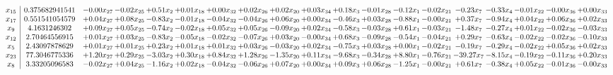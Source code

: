 \documentclass[9pt]{article}
\begin{document}
 \[\begin{array}{c| c c@{\hskip 2pt} c@{\hskip 2pt} c@{\hskip 2pt} c@{\hskip 2pt} c@{\hskip 2pt} c@{\hskip 2pt} c@{\hskip 2pt} c@{\hskip 2pt} c@{\hskip 2pt} c@{\hskip 2pt} c@{\hskip 2pt} c@{\hskip 2pt} c@{\hskip 2pt} c@{\hskip 2pt} c@{\hskip 2pt} c@{\hskip 2pt} c@{\hskip 2pt} }
 x_{15}   &  0.375682941541 & -0.00 x_{27} & -0.02 x_{25} & +  0.51 x_{2} & +  0.01 x_{18} & +  0.00 x_{32} & +  0.02 x_{26} & +  0.02 x_{20} & +  0.03 x_{34} & +  0.18 x_{3} & -0.01 x_{28} & -0.12 x_{1} & -0.02 x_{21} & -0.23 x_{7} & -0.33 x_{4} & -0.01 x_{22} & -0.00 x_{36} & +  0.00 x_{33}\\
 x_{17}   &  0.551541054579 & +  0.04 x_{27} & +  0.08 x_{25} & -0.83 x_{2} & -0.01 x_{18} & -0.04 x_{32} & -0.04 x_{26} & +  0.06 x_{20} & +  0.00 x_{34} & -0.46 x_{3} & +  0.03 x_{28} & -0.88 x_{1} & -0.00 x_{21} & +  0.37 x_{7} & -0.94 x_{4} & +  0.04 x_{22} & +  0.06 x_{36} & +  0.02 x_{33}\\
 x_{9}   &  4.1631246302 & +  0.09 x_{27} & +  0.05 x_{25} & -0.74 x_{2} & -0.02 x_{18} & +  0.05 x_{32} & +  0.05 x_{26} & -0.09 x_{20} & +  0.02 x_{34} & -0.58 x_{3} & -0.03 x_{28} & +  0.61 x_{1} & -0.03 x_{21} & -1.48 x_{7} & -0.27 x_{4} & +  0.01 x_{22} & -0.02 x_{36} & -0.03 x_{33}\\
 x_{12}   &  2.70464556915 & +  0.01 x_{27} & +  0.03 x_{25} & -0.83 x_{2} & -0.05 x_{18} & -0.02 x_{32} & -0.07 x_{26} & +  0.03 x_{20} & -0.00 x_{34} & +  0.68 x_{3} & -0.09 x_{28} & -0.54 x_{1} & -0.04 x_{21} & +  0.29 x_{7} & -0.63 x_{4} & -0.02 x_{22} & -0.02 x_{36} & -0.10 x_{33}\\
 x_{5}   &  2.43097878629 & +  0.01 x_{27} & +  0.01 x_{25} & +  0.23 x_{2} & +  0.01 x_{18} & +  0.01 x_{32} & +  0.03 x_{26} & -0.03 x_{20} & +  0.02 x_{34} & -0.75 x_{3} & +  0.03 x_{28} & +  0.00 x_{1} & -0.02 x_{21} & -0.19 x_{7} & -0.29 x_{4} & -0.02 x_{22} & +  0.05 x_{36} & +  0.02 x_{33}\\
 x_{23}   &  77.3046775336 & +  1.20 x_{27} & +  0.29 x_{25} & -3.03 x_{2} & +  0.30 x_{18} & +  0.84 x_{32} & +  1.28 x_{26} & -1.35 x_{20} & +  0.11 x_{34} & -9.68 x_{3} & -0.34 x_{28} & +  8.80 x_{1} & -0.76 x_{21} & -39.27 x_{7} & -8.15 x_{4} & -0.19 x_{22} & -0.11 x_{36} & +  0.20 x_{33}\\
 x_{8}   &  3.33205096583 & -0.02 x_{27} & +  0.04 x_{25} & -1.16 x_{2} & +  0.02 x_{18} & -0.04 x_{32} & -0.06 x_{26} & +  0.07 x_{20} & +  0.00 x_{34} & +  0.09 x_{3} & +  0.06 x_{28} & -1.25 x_{1} & -0.00 x_{21} & +  0.61 x_{7} & -0.38 x_{4} & +  0.05 x_{22} & -0.01 x_{36} & -0.00 x_{33}\\

\end{array}\]
\end{document}
